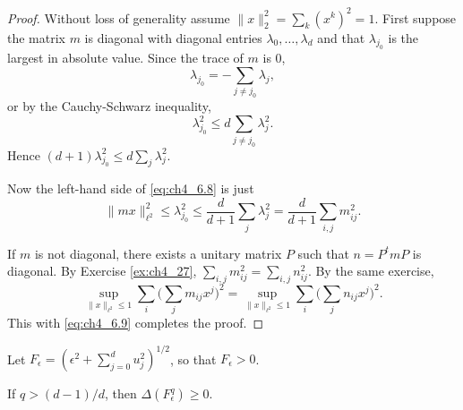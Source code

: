 \begin{proof}
Without loss of generality assume $\|x\|_2^2 = \sum_k(x^k)^2 = 1$. First suppose the matrix $m$ is diagonal with diagonal entries $\lambda_0,\ldots,\lambda_d$ and that $\lambda_{j_0}$ is the largest in absolute value. Since the trace of $m$ is $0$,
\[
    \lambda_{j_0} = -\sum_{j\neq j_0} \lambda_j,
\]
or by the Cauchy-Schwarz inequality,
\[
    \lambda_{j_0}^2 \leq d\sum_{j\neq j_0} \lambda_j^2.
\]
Hence $(d+1)\lambda_{j_0}^2 \leq d\sum_j \lambda_j^2$.

Now the left-hand side of \eqref{eq:ch4_6.8} is just
\begin{equation}\label{eq:ch4_6.9}
    \|mx\|_{\ell^2}^2 \leq \lambda_{j_0}^2 \leq \frac{d}{d+1}\sum_j \lambda_j^2 = \frac{d}{d+1}\sum_{i,j} m_{ij}^2.
\end{equation}

If $m$ is not diagonal, there exists a unitary matrix $P$ such that $n = P^tmP$ is diagonal. By Exercise \ref{ex:ch4_27}, $\sum_{i,j} m_{ij}^2 = \sum_{i,j} n_{ij}^2$. By the same exercise,
\begin{equation}\label{eq:ch4_6.10}
    \sup_{\|x\|_{\ell^2}\leq 1} \sum_i\Big(\sum_j m_{ij}x^j\Big)^2 = \sup_{\|x\|_{\ell^2}\leq 1} \sum_i\Big(\sum_j n_{ij}x^j\Big)^2.
\end{equation}
This with \eqref{eq:ch4_6.9} completes the proof.
\end{proof}

Let $F_\epsilon = (\epsilon^2 + \sum_{j=0}^d u_j^2)^{1/2}$, so that $F_\epsilon > 0$.


\begin{proposition}\label{prop:ch4_6.9}
If $q > (d-1)/d$, then $\Delta(F_\epsilon^q) \geq 0$.
\end{proposition}

